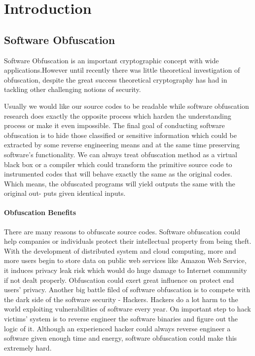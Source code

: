 \chapter{Introduction}
\section{\sloppy Software Obfuscation}
Software Obfuscation is an important cryptographic concept with wide applications.However until recently there\cite{Sen}
was little theoretical investigation of obfuscation, despite the
great success theoretical cryptography has had in tackling
other challenging notions of security\cite{lynn2004positive}. 

Usually we would like our source codes to be readable while software obfuscation research does exactly the opposite process which harden the understanding process or make it even impossible. 
The final goal of conducting
software obfuscation is to hide those classified or sensitive
information which could be extracted by some reverse engineering means and  at the same time preserving software’s functionality. We can always treat obfuscation method as a virtual
black box or a compiler which could transform the primitive
source code to instrumented codes that will behave exactly
the same as the original codes. Which means, the obfuscated programs will yield outputs the same with the original out-
puts given identical inputs.\cite{TuringmachineSimulation}





\subsubsection{Obfuscation Benefits}
There are many reasons to obfuscate source codes. Software obfuscation could help companies or individuals protect their intellectual property from being theft. With the development of distributed system and cloud computing, more and more users begin to store data on public web services like Amazon Web Service, it induces privacy leak risk which would do huge damage to Internet community if not dealt properly. Obfuscation could exert great  influence on protect end users' privacy. Another big battle filed of software obfuscation is to compete with the dark side of the software security - Hackers. Hackers do a lot harm to the world exploiting vulnerabilities of software every year. On important step to hack victims' system is to reverse engineer the software binaries and figure out the logic of it. Although an experienced hacker could always reverse engineer a software given enough time and energy, software obfuscation could make this extremely hard.


